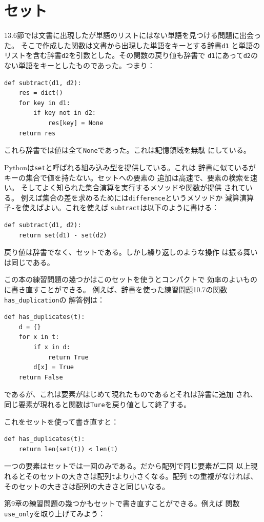 \documentclass[a4j,12pt,makeidx]{jbook}
\begin{document}
\section{セット}
13.6節では文書に出現したが単語のリストにはない単語を見つける問題に出会った。
そこで作成した関数は文書から出現した単語をキーとする辞書{\tt d1}
と単語のリストを含む辞書{\tt d2}を引数とした。その関数の戻り値も辞書で
{\tt d1}にあって{\tt d2}のない単語をキーとしたものであった。つまり：
\begin{verbatim}
def subtract(d1, d2):
    res = dict()
    for key in d1:
        if key not in d2:
            res[key] = None
    return res
\end{verbatim}
これら辞書では値は全て{\tt None}であった。これは記憶領域を無駄
にしている。\par
Pythonは{\tt set}と呼ばれる組み込み型を提供している。これは
辞書に似ているがキーの集合で値を持たない。セットへの要素の
追加は高速で、要素の検索を速い。
そしてよく知られた集合演算を実行するメソッドや関数が提供
されている。
例えば集合の差を求めるためには{\tt difference}というメソッドか
減算演算子{\tt -}を使えばよい。これを使えば
{\tt subtract}は以下のように書ける：
\begin{verbatim}
def subtract(d1, d2):
    return set(d1) - set(d2)
\end{verbatim}
戻り値は辞書でなく、セットである。しかし繰り返しのような操作
は振る舞いは同じである。\par
この本の練習問題の幾つかはこのセットを使うとコンパクトで
効率のよいものに書き直すことができる。
例えば、辞書を使った練習問題10.7の関数{\tt has\_duplication}の
解答例は：
\begin{verbatim}
def has_duplicates(t):
    d = {}
    for x in t:
        if x in d:
            return True
        d[x] = True
    return False
\end{verbatim}
であるが、これは要素がはじめて現れたものであるとそれは辞書に追加
され、同じ要素が現れると関数は{\tt Ture}を戻り値として終了する。\par
これをセットを使って書き直すと：
\begin{verbatim}
def has_duplicates(t):
    return len(set(t)) < len(t)
\end{verbatim}
一つの要素はセットでは一回のみである。だから配列で同じ要素が二回
以上現れるとそのセットの大きさは配列{\tt t}より小さくなる。配列
{\tt t}の重複がなければ、そのセットの大きさは配列の大きさと同じいなる。\par
第9章の練習問題の幾つかもセットで書き直すことができる。例えば
関数{\tt use\_only}を取り上げてみよう：
\end{document}
